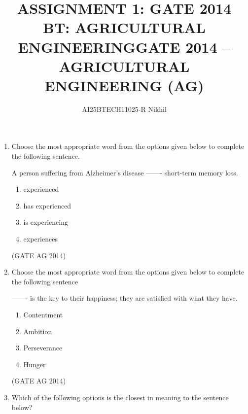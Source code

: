 \documentclass[journal,12pt,onecolumn]{IEEEtran}
\begin{document}
\title{
ASSIGNMENT 1: GATE 2014 \\
BT: AGRICULTURAL ENGINEERING}
\author{AI25BTECH11025-R Nikhil}
\maketitle
\renewcommand{\thefigure}{\theenumi}
\renewcommand{\thetable}{\theenumi}


\title{GATE 2014 -- AGRICULTURAL ENGINEERING (AG)}
\date{}
\maketitle




\begin{enumerate}
    \item Choose the most appropriate word from the options given below to complete the following sentence.

    A person suffering from Alzheimer’s disease ------- short-term memory loss.
    \begin{multicols}{2}
    \begin{enumerate}
        \item experienced
        \item has experienced
        \item is experiencing
        \item experiences
    \end{enumerate}
    \end{multicols}
    \hfill(GATE AG 2014)

    \item Choose the most appropriate word from the options given below to complete the following sentence

    ------- is the key to their happiness; they are satisfied with what they have.
    \begin{multicols}{4}
    \begin{enumerate}
        \item Contentment
        \item Ambition
        \item Perseverance
        \item Hunger
    \end{enumerate}
    \end{multicols}
    \hfill(GATE AG 2014)

    \item Which of the following options is the closest in meaning to the sentence below?


\end{enumerate}
\end{document}

